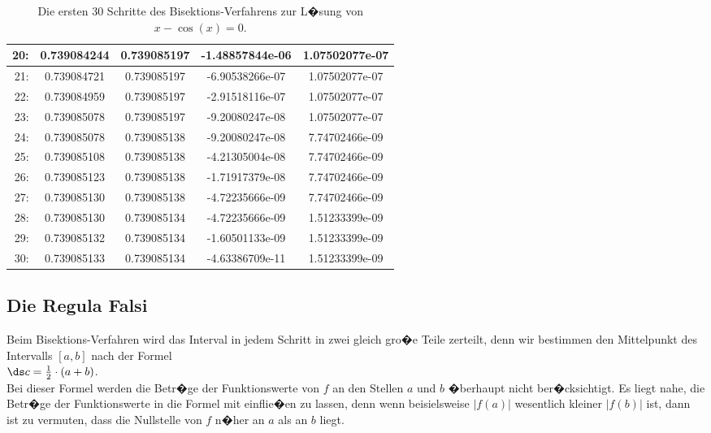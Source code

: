 \begin{table}[!h]
{\begin{tabular}{|r|c|c|c|c|}
\hline
 20: & 0.739084244 & 0.739085197 & -1.48857844e-06 & 1.07502077e-07 \\
\hline
 21: & 0.739084721 & 0.739085197 & -6.90538266e-07 & 1.07502077e-07 \\
\hline
 22: & 0.739084959 & 0.739085197 & -2.91518116e-07 & 1.07502077e-07 \\
\hline
 23: & 0.739085078 & 0.739085197 & -9.20080247e-08 & 1.07502077e-07 \\
\hline
 24: & 0.739085078 & 0.739085138 & -9.20080247e-08 & 7.74702466e-09 \\
\hline
 25: & 0.739085108 & 0.739085138 & -4.21305004e-08 & 7.74702466e-09 \\
\hline
 26: & 0.739085123 & 0.739085138 & -1.71917379e-08 & 7.74702466e-09 \\
\hline
 27: & 0.739085130 & 0.739085138 & -4.72235666e-09 & 7.74702466e-09 \\
\hline
 28: & 0.739085130 & 0.739085134 & -4.72235666e-09 & 1.51233399e-09 \\
\hline
 29: & 0.739085132 & 0.739085134 & -1.60501133e-09 & 1.51233399e-09 \\
\hline
 30: & 0.739085133 & 0.739085134 & -4.63386709e-11 & 1.51233399e-09 \\
\hline
  \end{tabular}}
  \caption{Die ersten 30 Schritte des Bisektions-Verfahrens zur L�sung von $x - \cos(x) = 0$.}
  \label{tab:bisection}
\end{table}


\subsection{Die Regula Falsi}
Beim Bisektions-Verfahren wird das Interval in jedem Schritt in zwei gleich gro�e Teile
zerteilt, denn wir bestimmen den Mittelpunkt des Intervalls $[a, b]$ nach der Formel
\\[0.2cm]
\hspace*{1.3cm}
$\ds c = \frac{1}{2} \cdot (a + b)$.
\\[0.2cm]
Bei dieser Formel werden die Betr�ge der Funktionswerte von $f$ an den Stellen $a$ und $b$ �berhaupt
nicht ber�cksichtigt.  Es liegt nahe, die Betr�ge der Funktionswerte in die Formel mit einflie�en zu
lassen, denn wenn beisielsweise $|f(a)|$ wesentlich kleiner $|f(b)|$ ist, dann ist zu
vermuten, dass die Nullstelle von $f$ n�her an $a$ als an $b$ liegt.


